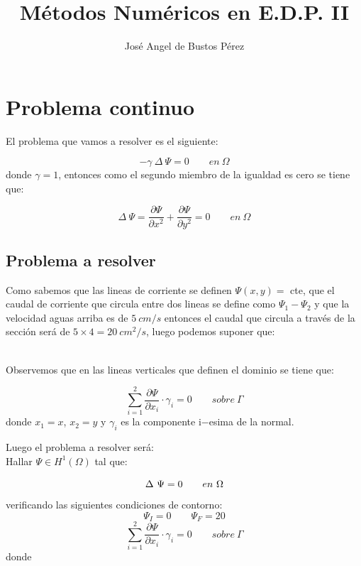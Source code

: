 \documentclass[a4paper,11pt]{article}
\title{M\'etodos Num\'ericos en E.D.P. II}
\author{Jos\'e Angel de Bustos P\'erez}
\begin{document}
\maketitle
\thispagestyle{empty}
\newpage

\section{Problema continuo}

El problema que vamos a resolver es el siguiente:

\begin{displaymath}
-\gamma \ \Delta \ \Psi = 0 \qquad en \ \Omega
\end{displaymath}
donde $\gamma = 1$, entonces como el segundo miembro de la igualdad es cero
se tiene que:

\begin{displaymath}
\Delta \ \Psi = \frac{\partial \Psi}{\partial x^2}+
\frac{\partial \Psi}{\partial y^2} = 0 \qquad en \ \Omega
\end{displaymath}

\subsection{Problema a resolver}

Como sabemos que las lineas de corriente se definen $\Psi (x,y) =$ cte, que el
caudal de corriente que circula entre dos lineas se define como $\Psi_1-\Psi_2$
y que la velocidad aguas arriba es de $5\ cm/s$ entonces el caudal que circula a
trav\'es de la secci\'on ser\'a de $5 \times 4=20\ cm^2/s$, luego podemos
suponer que:\newline \newline


\ \\
Observemos que en las lineas verticales que definen el dominio se tiene que:

\begin{displaymath}
\sum_{i=1}^2 \frac{\partial \Psi}{\partial x_i}\cdot \gamma_i = 0 \qquad sobre \ 
\Gamma
\end{displaymath}
donde $x_1= x$, $x_2=y$ y $\gamma_i$ es la componente i$-$esima de la normal.

\newpage

Luego el problema a resolver ser\'a:\\

Hallar $\Psi \in H^1(\Omega )$ tal que:

\begin{displaymath}
\Delta \ \Psi = 0\qquad en \ \Omega \\
\end{displaymath}
verificando las siguientes condiciones de contorno:
\begin{displaymath}
\Psi_I = 0 \qquad \Psi_F = 20
\end{displaymath}
\begin{displaymath}
\sum_{i=1}^2 \frac{\partial \Psi}{\partial x_i}\cdot \gamma_i = 0\qquad sobre \ 
\Gamma
\end{displaymath}
donde
\end{document}
